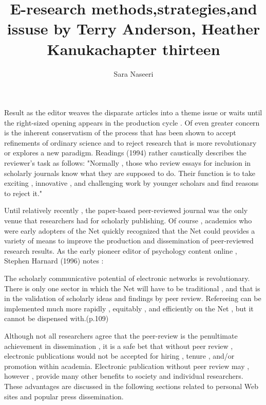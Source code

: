 \documentclass{beamer}
\title{E-research methods,strategies,and issuse by Terry Anderson, Heather Kanuka}
\author{Sara Naseeri}
\begin{document}
  {%
    \frame{\titlepage}
  }

  \begin{frame}
\title{chapter thirteen}

Result as the editor weaves the disparate articles into a theme issue or waits until the right-sized opening appears in the production cycle . Of even greater concern is the inherent conservatism of the process that has been shown to accept refinements of ordinary science and to reject research that is more revolutionary or explores a new paradigm. Readings (1994) rather caustically describes the reviewer's task as follows: "Normally , those who review essays for inclusion in scholarly journals know what they are supposed to do. Their function is to take exciting , innovative , and challenging work by younger scholars and find reasons to reject it."


  \end{frame}
  
    \begin{frame}
    
Until relatively recently , the paper-based peer-reviewed journal was the only venue that researchers had for scholarly publishing. Of course , academics who were early adopters of the Net quickly recognized that the Net could provides a variety of means to improve the production and dissemination of peer-reviewed research results. As the early pioneer editor of psychology content online , Stephen Harnard (1996) notes :



  \end{frame}
  
    \begin{frame}
  
The scholarly communicative potential of electronic networks is revolutionary. There is only one sector in which the Net will have to be traditional , and that is in the validation of scholarly ideas and findings by peer review. Refereeing can be implemented much more rapidly , equitably , and efficiently  on the Net , but it cannot be dispensed with.(p.109)

  \end{frame}
  
  \begin{frame}
Although not all researchers agree that the peer-review is the penultimate achievement in dissemination , it is a safe bet that without peer review , electronic publications would not be accepted for hiring , tenure , and/or promotion within academia. Electronic publication without peer review may , however , provide many other benefits to society and individual researchers. These advantages are discussed in the following sections related to personal Web sites and popular press dissemination.

  \end{frame}
\end{document}

